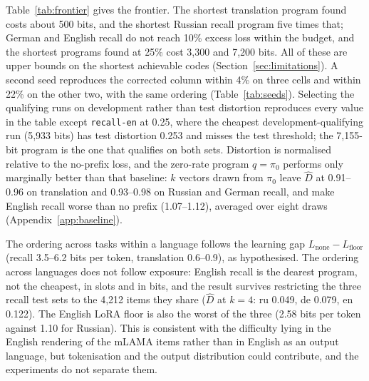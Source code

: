 \documentclass{article}
\newcommand{\Dh}{\hat D}
\newcommand{\cell}[1]{\texttt{#1}}
\begin{document}
Table~\ref{tab:frontier} gives the frontier. The shortest translation program found costs about 500 bits, and the shortest Russian recall program five times that; German and English recall do not reach 10\% excess loss within the budget, and the shortest programs found at 25\% cost 3,300 and 7,200 bits. All of these are upper bounds on the shortest achievable codes (Section~\ref{sec:limitations}). A second seed reproduces the corrected column within 4\% on three cells and within 22\% on the other two, with the same ordering (Table~\ref{tab:seeds}). Selecting the qualifying runs on development rather than test distortion reproduces every value in the table except \cell{recall-en} at 0.25, where the cheapest development-qualifying run (5,933 bits) has test distortion 0.253 and misses the test threshold; the 7,155-bit program is the one that qualifies on both sets. Distortion is normalised relative to the no-prefix loss, and the zero-rate program $q=\pi_0$ performs only marginally better than that baseline: $k$ vectors drawn from $\pi_0$ leave $\Dh$ at 0.91--0.96 on translation and 0.93--0.98 on Russian and German recall, and make English recall worse than no prefix (1.07--1.12), averaged over eight draws (Appendix~\ref{app:baseline}).

The ordering across tasks within a language follows the learning gap $L_{\text{none}}-L_{\text{floor}}$ (recall 3.5--6.2 bits per token, translation 0.6--0.9), as hypothesised. The ordering across languages does not follow exposure: English recall is the dearest program, not the cheapest, in slots and in bits, and the result survives restricting the three recall test sets to the 4,212 items they share ($\Dh$ at $k=4$: ru 0.049, de 0.079, en 0.122). The English LoRA floor is also the worst of the three (2.58 bits per token against 1.10 for Russian). This is consistent with the difficulty lying in the English rendering of the mLAMA items rather than in English as an output language, but tokenisation and the output distribution could contribute, and the experiments do not separate them.
\end{document}
